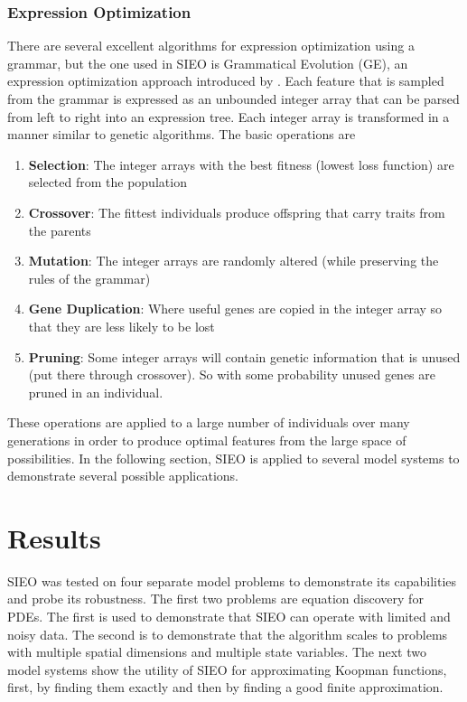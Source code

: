\documentclass{article}
\begin{document}
\subsubsection{Expression Optimization}
There are several excellent algorithms for expression optimization using a grammar, but the one used in SIEO is  Grammatical Evolution (GE), an expression optimization approach introduced by \cite{ryan1998grammatical}. Each feature that is sampled from the grammar is expressed as an unbounded integer array that can be parsed from left to right into an expression tree. Each integer array is transformed in a manner similar to genetic algorithms. The basic operations are
\begin{enumerate}
\item \textbf{Selection}: The integer arrays with the best fitness (lowest loss function) are selected from the population
\item \textbf{Crossover}: The fittest individuals produce offspring that carry traits from the parents
\item \textbf{Mutation}: The integer arrays are randomly altered (while preserving the rules of the grammar)
\item \textbf{Gene Duplication}: Where useful genes are copied in the integer array so that they are less likely to be lost
\item \textbf{Pruning}: Some integer arrays will contain genetic information that is unused (put there through crossover). So with some probability unused genes are pruned in an individual.
\end{enumerate}

These operations are applied to a large number of individuals over many generations in order to produce optimal features from the large space of possibilities. In the following section, SIEO is applied to several model systems to demonstrate several possible applications.


\section{Results}
\label{results}
SIEO was tested on four separate model problems to demonstrate its capabilities and probe its robustness. The first two problems are equation discovery for PDEs. The first is used to demonstrate that SIEO can operate with limited and noisy data. The second is to demonstrate that the algorithm scales to problems with multiple spatial dimensions and multiple state variables. The next two model systems show the utility of SIEO for approximating Koopman functions, first, by finding them exactly and then by finding a good finite approximation.
\end{document}
